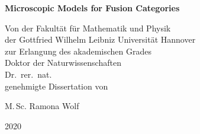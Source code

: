 

\begin{titlepage}

\begin{center}
	\vspace*{1cm}
	{\LARGE\bfseries
		Microscopic Models for Fusion Categories
		\par}
	\vspace*{10cm}
	{
		Von der Fakultät für Mathematik und Physik\\[2mm]
		der Gottfried Wilhelm Leibniz Universität Hannover\\
		\vspace{8mm}
		zur Erlangung des akademischen Grades\\[2mm]
		{Doktor der Naturwissenschaften}\\[2mm]
		Dr.\ rer.\ nat.\\
		\vspace{8mm}
		genehmigte Dissertation von\par
	}
	\vspace*{1cm}
	{\LARGE
		M.\,Sc. Ramona Wolf
		\par}
	\vspace*{2cm}
	{
		2020
	}
\end{center}

\end{titlepage}

